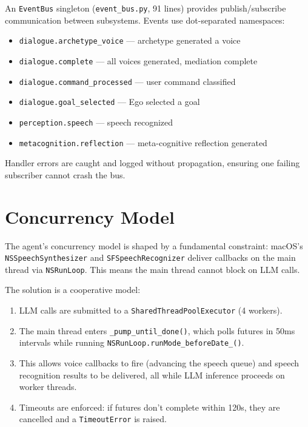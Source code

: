 \documentclass[11pt,oneside]{article}
\begin{document}
An \texttt{EventBus} singleton (\texttt{event\_bus.py}, 91 lines) provides publish/subscribe communication between subsystems.
Events use dot-separated namespaces:

\begin{itemize}
  \item \texttt{dialogue.archetype\_voice} --- archetype generated a voice
  \item \texttt{dialogue.complete} --- all voices generated, mediation complete
  \item \texttt{dialogue.command\_processed} --- user command classified
  \item \texttt{dialogue.goal\_selected} --- Ego selected a goal
  \item \texttt{perception.speech} --- speech recognized
  \item \texttt{metacognition.reflection} --- meta-cognitive reflection generated
\end{itemize}

Handler errors are caught and logged without propagation, ensuring one failing subscriber cannot crash the bus.


\section{Concurrency Model}
\label{sec:concurrency}

The agent's concurrency model is shaped by a fundamental constraint: macOS's \texttt{NSSpeechSynthesizer} and \texttt{SFSpeechRecognizer} deliver callbacks on the main thread via \texttt{NSRunLoop}.
This means the main thread cannot block on LLM calls.

The solution is a cooperative model:

\begin{enumerate}
  \item LLM calls are submitted to a \texttt{SharedThreadPoolExecutor} (4 workers).
  \item The main thread enters \texttt{\_pump\_until\_done()}, which polls futures in 50ms intervals while running \texttt{NSRunLoop.runMode\_beforeDate\_()}.
  \item This allows voice callbacks to fire (advancing the speech queue) and speech recognition results to be delivered, all while LLM inference proceeds on worker threads.
  \item Timeouts are enforced: if futures don't complete within 120s, they are cancelled and a \texttt{TimeoutError} is raised.
\end{enumerate}
\end{document}

